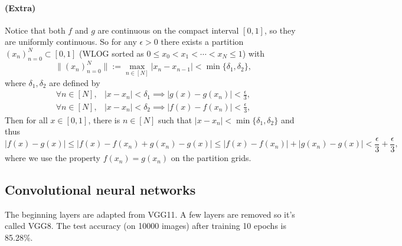 \documentclass[12pt]{article}
\begin{document}
\paragraph{(Extra)}
Notice that both \(f\) and \(g\) are continuous on the compact interval \([0, 1]\), so they are uniformly continuous.
So for any \(\epsilon>0\) there exists a partition \((x_n)_{n=0}^{N}\subset[0, 1]\) (WLOG sorted as \(0\leq x_0<x_1<\cdots<x_N\leq1\)) with
\[ \|(x_n)_{n=0}^{N}\|:= \max_{n\in[N]}|x_{n}-x_{n-1}| < \min\{\delta_1, \delta_2\}, \]
where \(\delta_1, \delta_2\) are defined by
\begin{align*}
    \forall n\in[N],& |x-x_n|<\delta_1 \implies |g(x)-g(x_n)|<\frac{\epsilon}{3},\\
    \forall n\in[N],& |x-x_n|<\delta_2 \implies |f(x)-f(x_n)|<\frac{\epsilon}{3},
\end{align*}
Then for all \(x\in[0, 1]\), there is \(n\in[N]\) such that \(|x-x_n|<\min\{\delta_1, \delta_2\}\) and thus
\[ |f(x)-g(x)| \leq |f(x)-f(x_n)+g(x_n)-g(x)| \leq |f(x)-f(x_n)|+|g(x_n)-g(x)| < \frac{\epsilon}{3}+\frac{\epsilon}{3}, \]
where we use the property \(f(x_n)=g(x_n)\) on the partition grids.
\newpage

\subsection{Convolutional neural networks}
The beginning layers are adapted from VGG11.
A few layers are removed so it's called VGG8.
The test accuracy (on 10000 images) after training 10 epochs is 85.28\%.
\inputminted[breaklines=true, linenos=true]{python}{./Homework2/ex3.py}
\end{document}
